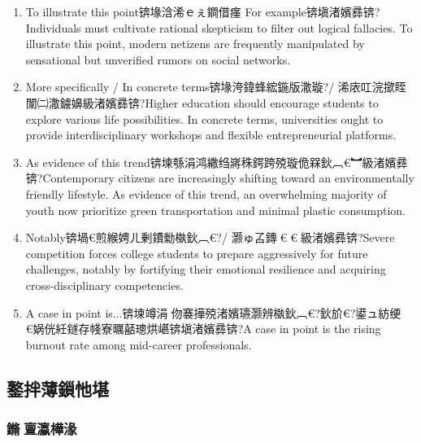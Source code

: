 ﻿\documentclass[lang=cn,11pt]{elegantbook}
\begin{document}
\begin{enumerate}
\item To illustrate this point锛堟浛浠ｅぇ鐧借瘽 For example锛塡渚嬪彞锛?Individuals must cultivate rational skepticism to filter out logical fallacies. To illustrate this point, modern netizens are frequently manipulated by sensational but unverified rumors on social networks.
\item More specifically / In concrete terms锛堟洿鍏蜂綋鍦版潵璇?/ 浠庡叿浣撳眰闈㈡潵鐪嬶級渚嬪彞锛?Higher education should encourage students to explore various life possibilities. In concrete terms, universities ought to provide interdisciplinary workshops and flexible entrepreneurial platforms.
\item As evidence of this trend锛堜綔涓鸿繖绉嶈秼鍔跨殑璇佹槑鈥︹€︼級渚嬪彞锛?Contemporary citizens are increasingly shifting toward an environmentally friendly lifestyle. As evidence of this trend, an overwhelming majority of youth now prioritize green transportation and minimal plastic consumption.
\item Notably锛堝€煎緱娉ㄦ剰鐨勬槸鈥︹€?/ 灏ゅ叾鏄€︹€︼級渚嬪彞锛?Severe competition forces college students to prepare aggressively for future challenges, notably by fortifying their emotional resilience and acquiring cross-disciplinary competencies.
\item  A case in point is...锛堜竴涓伆褰撶殑渚嬪瓙灏辨槸鈥︹€?鈥斺€?鍙ュ紡绠€娲侊紝鐩存帴寮曞嚭璁烘嵁锛塡渚嬪彞锛?A case in point is the rising burnout rate among mid-career professionals.
\end{enumerate}


\subsection{鐜拌薄鎻忚堪}

\subsubsection{鏅亶瀛樺湪}
\end{document}
